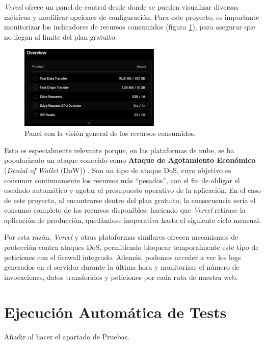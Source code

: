 \textit{Vercel} ofrece un panel de control desde donde se pueden visualizar diversas métricas y modificar opciones de configuración. Para este proyecto, es importante monitorizar los indicadores de recursos consumidos (figura \ref{fig:usage_overview}), para asegurar que no llegan al límite del plan gratuito.

\begin{figure}[H]
    \centering
    \includegraphics[width=0.6\textwidth]{figures/despliegue/usage_overview.png}
    \caption{Panel con la visión general de los recursos consumidos.}
    \label{fig:usage_overview}
\end{figure}

\newpage

Esto es especialmente relevante porque, en las plataformas de nube, se ha popularizado un ataque conocido como \textbf{Ataque de Agotamiento Económico} (\textit{Denial of Wallet} (DoW)) \cite{vercelDoW2025}. Son un tipo de ataque DoS, cuyo objetivo es consumir continuamente los recursos más ``pesados'', con el fin de obligar el escalado automático y agotar el presupuesto operativo de la aplicación. En el caso de este proyecto, al encontrarse dentro del plan gratuito, la consecuencia sería el consumo completo de los recursos disponibles; haciendo que \textit{Vercel} retirase la aplicación de producción, quedándose inoperativa hasta el siguiente ciclo mensual.

Por esta razón, \textit{Vercel} y otras plataformas similares ofrecen mecanismos de protección contra ataques DoS, permitiendo bloquear temporalmente este tipo de peticiones con el firewall integrado. Además, podemos acceder a ver los logs generados en el servidor durante la última hora y monitorizar el número de invocaciones, datos transferidos y peticiones por cada ruta de nuestra web.


\section{Ejecución Automática de Tests}
Añadir al hacer el apartado de Pruebas.
